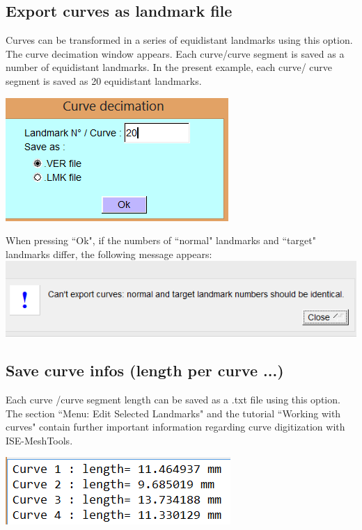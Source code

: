 \subsection{Export curves as landmark file}
\begin{minipage}{0.55\textwidth}

Curves can be transformed in a series of equidistant
landmarks using this option. The curve decimation window
appears.
Each curve/curve segment is saved as a number of
equidistant landmarks. In the present example, each curve/
curve segment is saved as 20 equidistant landmarks.

\end{minipage}  
 \begin{minipage}{0.45\textwidth}\centering
  \includegraphics[scale=0.5]{images/Landmarks/Export_curves.png}
 \end{minipage} 

When pressing ``Ok", if the numbers of ``normal" landmarks and ``target" landmarks differ, the
following message appears:\\
\includegraphics[scale=0.5]{images/Landmarks/Can_not_export.png}

\subsection{Save curve infos (length per curve ...)}
\begin{minipage}{0.55\textwidth}

Each curve /curve segment length can be saved as a .txt file
using this option.
The section ``Menu: Edit Selected Landmarks" and the
tutorial ``Working with curves" contain further important
information regarding curve digitization with ISE-MeshTools.

\end{minipage}  
 \begin{minipage}{0.45\textwidth}\centering
  \includegraphics[scale=0.5]{images/Landmarks/Curve_infos.png}
 \end{minipage} 



